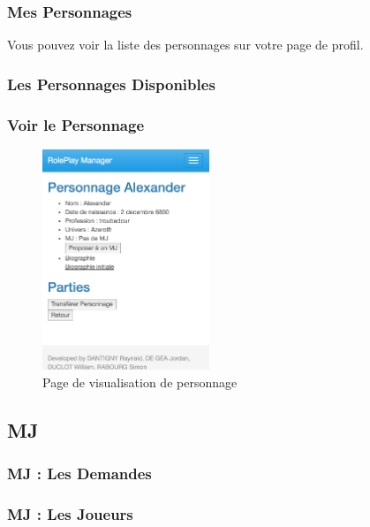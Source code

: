 \documentclass[a4paper,oneside,10pt]{article}
\begin{document}
\subsubsection{Mes Personnages}
\label{MUMesPersonnages}

Vous pouvez voir la liste des personnages sur votre page de profil. 

\subsubsection{Les Personnages Disponibles}
\label{MULesPersonnagesDisponibles}


\subsubsection{Voir le Personnage}
\label{MUVoirLePersonnage}

\begin{figure}[H]
	\begin{center}
		\includegraphics[width=5cm]{images/manuel/voirpersonnage.png}  
		\caption{Page de visualisation de personnage}
	\end{center}
\end{figure}


\subsection{MJ}

\subsubsection{MJ : Les Demandes}
\label{MUMJLesDemandes}

\subsubsection{MJ : Les Joueurs}
\label{MUMJLesJoueurs}
\end{document}
